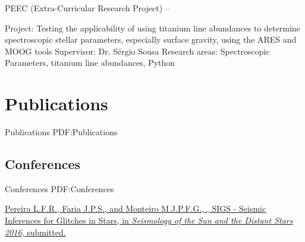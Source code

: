 \documentclass[letterpaper,10pt,oneside]{article}
\begin{document}
\begin{body}
\GapNoBreak
\BulletItem
PEEC (Extra-Curricular Research Project)
\hfill
{} --
\begin{detail}
\SubBulletItem
Project:
Testing the applicability of using titanium line abundances to determine spectroscopic stellar parameters, especially surface gravity, using the ARES and MOOG tools
\SubBulletItem
Supervisor:
Dr. Sérgio Sousa
\SubBulletItem
Research areas: Spectroscopic Parameters, titanium line abundances, Python
\end{detail}


\section
{Publications}
{Publications}
{PDF:Publications}




\subsection
{Conferences}
{Conferences}
{PDF:Conferences}

\GapNoBreak
{}
\href{}
{\underline{Pereira L.F.R.}, Faria J.P.S., and Monteiro M.J.P.F.G., 
, 
SIGS - Seismic Inferences for Glitches in Stars,
in \textit{Seismology of the Sun and the Distant Stars 2016},
submitted.}



\end{body}
\end{document}
